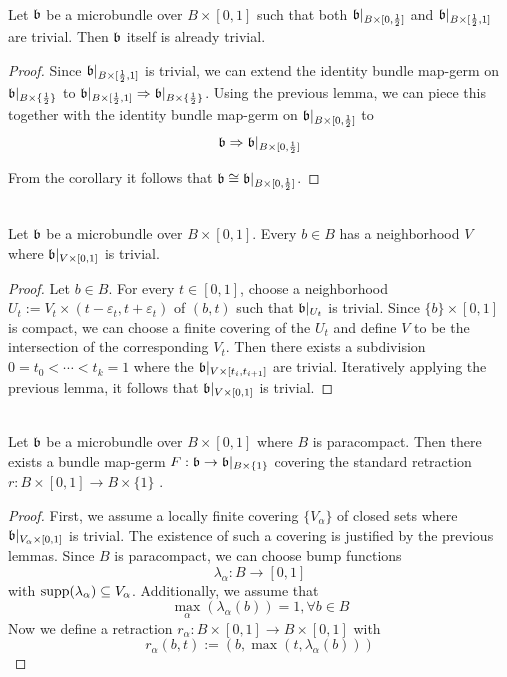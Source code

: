 \begin{file}
\newcommand{\A}[1][] {
    A_\alpha#1
}

\newcommand{\bbleft} {
    \bb\restr{B \times{} [0, \half]}
}
\newcommand{\bbright} {
    \bb\restr{B \times{} [\half, 1]}
}
\newcommand{\bbhalf} {
    \bb\restr{B \times{} \{ \half \}}
}

 \\
Let $\mathfrak{b}$ be a microbundle over $B \times [0, 1]$ such that both $\bbleft$ and $\bbright$ are trivial.
Then $\mathfrak{b}$ itself is already trivial.
\begin{proof}
Since $\bbright$ is trivial, we can extend the identity bundle map-germ on $\bbhalf$ to $\bbright \double \bbhalf$.
Using the previous lemma, we can piece this together with the identity bundle map-germ on $\bbleft$ to
\[ \bb \double \bbleft \]

From the corollary it follows that $\bb \cong \bbleft$.
\end{proof}

\lemma{\parttitle{}} \\
Let $\mathfrak{b}$ be a microbundle over $B \times [0, 1]$.
Every $b \in B$ has a neighborhood $V$ where $\mathfrak{b}\vert_{V \times [0, 1]}$ is trivial.
\begin{proof}
Let $b \in B$.
For every $t \in [0, 1]$, choose a neighborhood $U_t := V_t \times (t - \varepsilon_t, t + \varepsilon_t)$ of $(b, t)$ such that $\mathfrak{b}\vert_{U_t}$ is trivial.
Since $\{b\} \times [0, 1]$ is compact, we can choose a finite covering of the $U_t$ and define $V$ to be the intersection of the corresponding $V_t$.
Then there exists a subdivision $0 = t_0 < \cdots < t_k = 1$ where the $\mathfrak{b}\vert_{V \times [t_{i}, t_{i + 1}]}$ are trivial.
Iteratively applying the previous lemma, it follows that $\mathfrak{b}\vert_{V \times [0, 1]}$ is trivial.
\end{proof}

\lemma{\parttitle{}} \\
Let $\mathfrak{b}$ be a microbundle over $B \times [0, 1]$ where $B$ is paracompact.
Then there exists a bundle map-germ $F: \mathfrak{b} \to \mathfrak{b}\vert_{B \times \{1\}}$
covering the standard retraction $r: B \times [0, 1] \to B \times \{1\}$ .
\begin{proof}
First, we assume a locally finite covering $\{V_\alpha\}$ of closed sets where $\mathfrak{b}\vert_{V_\alpha \times [0, 1]}$ is trivial.
The existence of such a covering is justified by the previous lemmas.
Since $B$ is paracompact, we can choose bump functions 
\[ \lambda_\alpha: B \to [0, 1] \]
with $\text{supp}(\lambda_\alpha) \subseteq{} V_\alpha$.
Additionally, we assume that 
\[ \max_{\alpha}(\lambda_\alpha(b)) = 1, \forall b \in B \]
Now we define a retraction $r_\alpha: B \times [0, 1] \to B \times [0, 1]$ with
\[ r_\alpha(b, t) := (b, \max(t, \lambda_\alpha(b))) \]


\end{proof}
\end{file}
